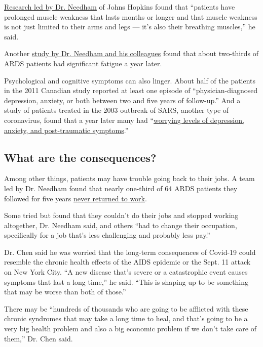 \href{https://pubmed.ncbi.nlm.nih.gov/27637716/}{Research led by Dr.
Needham} of Johns Hopkins found that ``patients have prolonged muscle
weakness that lasts months or longer and that muscle weakness is not
just limited to their arms and legs --- it's also their breathing
muscles,'' he said.

Another \href{https://pubmed.ncbi.nlm.nih.gov/32304774/}{study by Dr.
Needham and his colleagues} found that about two-thirds of ARDS patients
had significant fatigue a year later.

Psychological and cognitive symptoms can also linger. About half of the
patients in the 2011 Canadian study reported at least one episode of
``physician-diagnosed depression, anxiety, or both between two and five
years of follow-up.'' And a study of patients treated in the 2003
outbreak of SARS, another type of coronavirus, found that a year later
many had ``\href{https://pubmed.ncbi.nlm.nih.gov/17500304/}{worrying
levels of depression, anxiety, and post-traumatic symptoms}.''

\hypertarget{what-are-the-consequences}{%
\subsection{What are the
consequences?}\label{what-are-the-consequences}}

Among other things, patients may have trouble going back to their jobs.
A team led by Dr. Needham found that nearly one-third of 64 ARDS
patients they followed for five years
\href{https://www.ncbi.nlm.nih.gov/pmc/articles/PMC6002952/}{never
returned to work}.

Some tried but found that they couldn't do their jobs and stopped
working altogether, Dr. Needham said, and others ``had to change their
occupation, specifically for a job that's less challenging and probably
less pay.''

Dr. Chen said he was worried that the long-term consequences of Covid-19
could resemble the chronic health effects of the AIDS epidemic or the
Sept. 11 attack on New York City. ``A new disease that's severe or a
catastrophic event causes symptoms that last a long time,'' he said.
``This is shaping up to be something that may be worse than both of
those.''

There may be ``hundreds of thousands who are going to be afflicted with
these chronic syndromes that may take a long time to heal, and that's
going to be a very big health problem and also a big economic problem if
we don't take care of them,'' Dr. Chen said.

